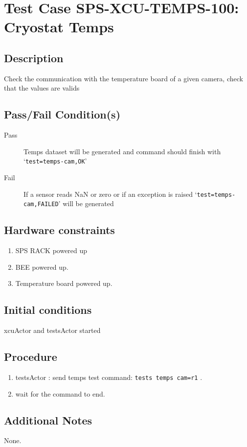 \section{Test Case SPS-XCU-TEMPS-100: Cryostat Temps}

\subsection{Description}

Check the communication with the temperature board of a given camera, check that the values are valids

\subsection{Pass/Fail Condition(s)}

\begin{description}
\item [Pass] Temps dataset will be generated and command should finish with `\texttt{test=temps-cam,OK}'
\item [Fail] If a sensor reads NaN or zero or if an exception is raised `\texttt{test=temps-cam,FAILED}' will be generated

\end{description}

\subsection{Hardware constraints}

\begin{enumerate}
    \item SPS RACK powered up
    \item \acrshort{BEE} powered up.
    \item Temperature board powered up.
\end{enumerate}

\subsection{Initial conditions}

xcuActor and testsActor started

\subsection{Procedure}

\begin{enumerate}
    \item testsActor : send temps test command: \texttt{tests temps cam=r1} .
    \item wait for the command to end.
\end{enumerate}

\subsection{Additional Notes}
None.
